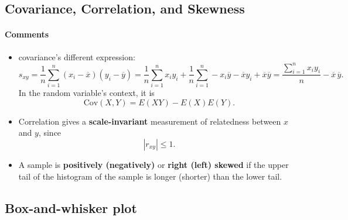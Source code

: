 \documentclass[12pt]{report}
\theoremstyle{definition}
\begin{document}
\subsection{Covariance, Correlation, and Skewness}

\noindent{}
\paragraph{Comments}
\begin{itemize}
        \item covariance's different expression:
            \[
                s_{xy}=\frac{1}{n}\sum_{i=1}^{n}
                (x_i-\overline{x})(y_i-\overline{y})
                = \frac{1}{n}\sum_{i=1}^{n} x_iy_i+
                \frac{1}{n}\sum_{i=1}^{n} -x_i \overline{y}
                -\overline{x}y_i+\overline{x}\overline{y}
                = \frac{\sum_{i=1}^{n} x_iy_i}{n}
                -\overline{x}\,\overline{y}.
            \]
            In the random variable's context, it is
            \[
                \text{Cov}(X,Y)=E(XY)-E(X)E(Y).
            \]
        \item Correlation gives a \textbf{scale-invariant}
            measurement of relatedness between $x$ and $y$, since
            \[
                |r_{xy}|\le 1.
            \]
        \item A sample is \textbf{positively (negatively)} or
            \textbf{right (left) skewed} if the upper tail of the histogram of
            the sample is longer (shorter) than the lower tail.
\end{itemize} 

\subsection{Box-and-whisker plot}
\end{document}
